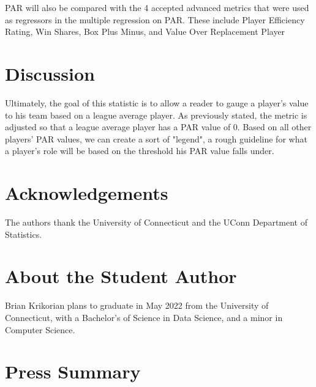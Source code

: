 \documentclass[12pt]{article}
\begin{document}
PAR will also be compared with the 4 accepted advanced metrics that were used as regressors in the 
multiple regression on PAR. These include Player Efficiency Rating, Win Shares, Box Plus Minus, and 
Value Over Replacement Player

\section{Discussion}
Ultimately, the goal of this statistic is to allow a reader to gauge a player's value to his team based on a 
league average player. As previously stated, the metric is adjusted so that a league average player has a 
PAR value of 0. Based on all other players' PAR values, we can create a sort of "legend", a rough guideline 
for what a player's role will be based on the threshold his PAR value falls under.



\section*{Acknowledgements}
The authors thank the University of Connecticut and the UConn Department of Statistics.






\section*{About the Student Author}
Brian Krikorian plans to graduate in May 2022 from the University of Connecticut, with a Bachelor's of Science in Data Science, and a minor in Computer Science.

\section*{Press Summary}
\end{document}
